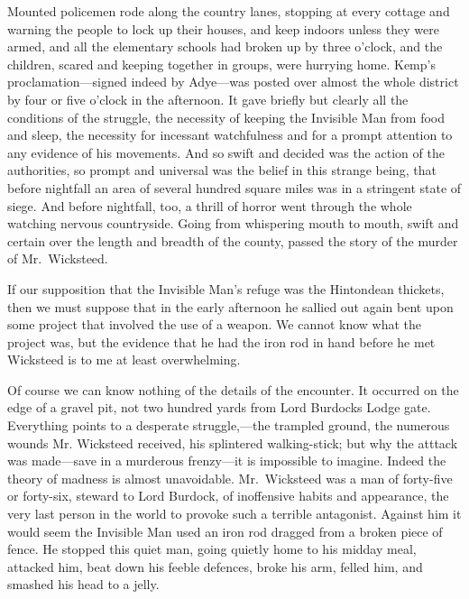 Mounted policemen rode along the country lanes, stopping at every cottage and warning the people to lock up their houses, and keep indoors unless they were armed, and all the elementary schools had broken up by three o’clock, and the children, scared and keeping together in groups, were hurrying home. Kemp’s proclamation—signed indeed by Adye—was posted over almost the whole district by four or five o’clock in the afternoon. It gave briefly but clearly all the conditions of the struggle, the necessity of keeping the Invisible Man from food and sleep, the necessity for incessant watchfulness and for a prompt attention to any evidence of his movements. And so swift and decided was the action of the authorities, so prompt and universal was the belief in this strange being, that before nightfall an area of several hundred square miles was in a stringent state of siege. And before nightfall, too, a thrill of horror went through the whole watching nervous countryside. Going from whispering mouth to mouth, swift and certain over the length and breadth of the county, passed the story of the murder of Mr.\ Wicksteed.

If our supposition that the Invisible Man’s refuge was the Hintondean thickets, then we must suppose that in the early afternoon he sallied out again bent upon some project that involved the use of a weapon. We cannot know what the project was, but the evidence that he had the iron rod in hand before he met Wicksteed is to me at least overwhelming.

Of course we can know nothing of the details of the encounter. It occurred on the edge of a gravel pit, not two hundred yards from Lord Burdocks Lodge gate. Everything points to a desperate struggle,—the trampled ground, the numerous wounds Mr. Wicksteed received, his splintered walking-stick; but why the atttack was made—save in a murderous frenzy—it is impossible to imagine. Indeed the theory of madness is almost unavoidable. Mr.\ Wicksteed was a man of forty-five or forty-six, steward to Lord Burdock, of inoffensive habits and appearance, the very last person in the world to provoke such a terrible antagonist. Against him it would seem the Invisible Man used an iron rod dragged from a broken piece of fence. He stopped this quiet man, going quietly home to his midday meal, attacked him, beat down his feeble defences, broke his arm, felled him, and smashed his head to a jelly.

